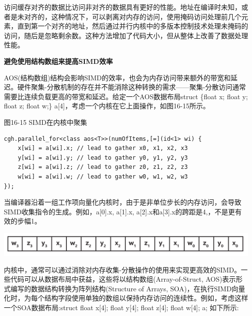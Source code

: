 访问缓存对齐的数据比访问非对齐的数据具有更好的性能。地址在编译时未知，或者是未对齐的，这种情况下，可以剥离对内存的访问，使用掩码访问处理前几个元素，直到第一个对齐的地址，然后通过并行内核中的多版本控制技术处理未掩码的访问，随后是忽略剩余数。这种方法增加了代码大小，但从整体上改善了数据处理性能。\par

\hspace*{\fill} \par %
\textbf{避免使用结构数组来提高SIMD效率}

AOS(结构数组)结构会影响SIMD的效率，也会为内存访问带来额外的带宽和延迟。硬件聚集-分散机制的存在并不能消除这种转换的需求——聚集-分散访问通常需要比连续负载更高的带宽和延迟。给定一个AOS数据布局struct \{float x; float y; float z; float w;\} a[4]，考虑一个内核在它上面操作，如图16-15所示。\par

\hspace*{\fill} \par %
图16-15 SIMD在内核中聚集
\begin{lstlisting}[caption={}]
cgh.parallel_for<class aos<T>>(numOfItems,[=](id<1> wi) {
	x[wi] = a[wi].x; // lead to gather x0, x1, x2, x3
	y[wi] = a[wi].y; // lead to gather y0, y1, y2, y3
	z[wi] = a[wi].z; // lead to gather z0, z1, z2, z3 
	w[wi] = a[wi].w; // lead to gather w0, w1, w2, w3
});
\end{lstlisting}

当编译器沿着一组工作项向量化内核时，由于是非单位步长的内存访问，会导致SIMD收集指令的生成。例如，a[0].x, a[1].x, a[2].x和a[3].x的跨距是4,，不是更有效的步幅1。\par

\begin{center}
	\includegraphics[width=1.0\textwidth]{content/chapter-16/images/8}
\end{center}

内核中，通常可以通过消除对内存收集-分散操作的使用来实现更高效的SIMD。一些代码可以从数据布局中获益，这些将以结构数组(Array-of-Struct, AOS)表示形式编写的数据结构转换为阵列结构(Structure of Arrays, SOA)，在执行SIMD向量化时，为每个结构字段使用单独的数组以保持内存访问的连续性。例如，考虑这样一个SOA数据布局:struct {float x[4]; float y[4]; float z[4]; float w[4];} a; 如下所示:\par

